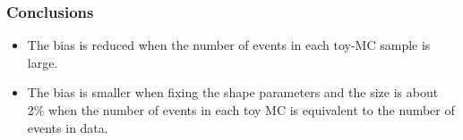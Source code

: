 \documentclass{beamer}
\begin{document}
\begin{frame}
  \frametitle{Conclusions}
  \begin{center}
    \begin{footnotesize}
      \begin{itemize}
      \item The bias is reduced when the number of events in each toy-MC sample is large.
      \item The bias is smaller when fixing the shape parameters and the size is about 2\% when the number of events in each toy MC is equivalent to the number of events in data.
      \end{itemize}
    \end{footnotesize}
  \end{center}
\end{frame}
\end{document}
